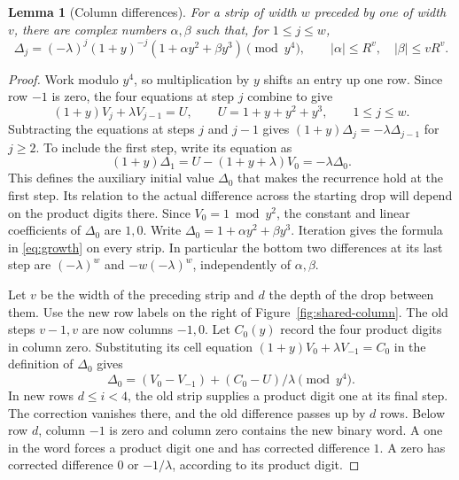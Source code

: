 \documentclass[11pt,reqno]{amsart}
\newtheorem{lemma}[theorem]{Lemma}
\begin{document}
\begin{lemma}[Column differences]\label{lem:growth}
For a strip of width \(w\) preceded by one of width \(v\), there are complex numbers \(\alpha,\beta\) such that, for \(1\le j\le w\),
\begin{equation}\label{eq:growth}
 \Delta_j=(-\lambda)^j(1+y)^{-j}(1+\alpha y^2+\beta y^3)\pmod{y^4},
 \qquad |\alpha|\le R^v,\quad |\beta|\le vR^v .
\end{equation}
\end{lemma}
\begin{proof}
Work modulo \(y^4\), so multiplication by \(y\) shifts an entry up one row. Since row \(-1\) is zero, the four equations at step \(j\) combine to give
\[
 (1+y)V_j+\lambda V_{j-1}=U,\qquad U=1+y+y^2+y^3,\qquad 1\le j\le w.
\]
Subtracting the equations at steps \(j\) and \(j-1\) gives \((1+y)\Delta_j=-\lambda\Delta_{j-1}\) for \(j\ge2\). To include the first step, write its equation as
\[
 (1+y)\Delta_1=U-(1+y+\lambda)V_0=-\lambda\Delta_0 .
\]
This defines the auxiliary initial value \(\Delta_0\) that makes the recurrence hold at the first step. Its relation to the actual difference across the starting drop will depend on the product digits there. Since \(V_0=1\bmod y^2\), the constant and linear coefficients of \(\Delta_0\) are \(1,0\). Write \(\Delta_0=1+\alpha y^2+\beta y^3\). Iteration gives the formula in \eqref{eq:growth} on every strip. In particular the bottom two differences at its last step are \((-\lambda)^w\) and \(-w(-\lambda)^w\), independently of \(\alpha,\beta\).

Let \(v\) be the width of the preceding strip and \(d\) the depth of the drop between them. Use the new row labels on the right of Figure~\ref{fig:shared-column}. The old steps \(v-1,v\) are now columns \(-1,0\). Let \(C_0(y)\) record the four product digits in column zero. Substituting its cell equation \((1+y)V_0+\lambda V_{-1}=C_0\) in the definition of \(\Delta_0\) gives
\[
 \Delta_0=(V_0-V_{-1})+(C_0-U)/\lambda \pmod{y^4}.
\]
In new rows \(d\le i<4\), the old strip supplies a product digit one at its final step. The correction vanishes there, and the old difference passes up by \(d\) rows. Below row \(d\), column \(-1\) is zero and column zero contains the new binary word. A one in the word forces a product digit one and has corrected difference \(1\). A zero has corrected difference \(0\) or \(-1/\lambda\), according to its product digit.


\end{proof}
\end{document}
